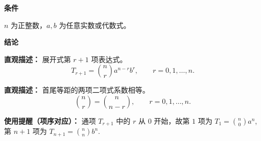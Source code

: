 \begin{statementbox}
	\textbf{\textcolor{CStatement}{条件}}
	\begin{description}[style=nextline, leftmargin=2.8em, labelsep=0.5em, itemsep=0.35em]
		\item[\textbf{\textcolor{CStatement}{条件 1（正整数与变量）：}}] $n$ 为正整数，$a, b$ 为任意实数或代数式。
	\end{description}

	\textbf{\textcolor{CStatement}{结论}}
	\begin{description}[style=nextline, leftmargin=2.8em, labelsep=0.5em, itemsep=0.45em]
		\item[\textbf{\textcolor{CStatement}{结论一（通项公式）：}}]
			\textbf{\textcolor{CStatement}{直观描述：}}
			展开式第 $r+1$ 项表达式。
			\[
				T_{r+1} = \binom{n}{r} a^{n-r} b^{r},
				\qquad
				r = 0,1,\dots, n.
			\]

		\item[\textbf{\textcolor{CStatement}{推广结论（系数对称）：}}]
			\textbf{\textcolor{CStatement}{直观描述：}}
			首尾等距的两项二项式系数相等。
			\[
				\binom{n}{r} = \binom{n}{n-r},
				\qquad
				r = 0,1,\dots,n.
			\]
	\end{description}

	\medskip
	\textbf{\textcolor{CStatement}{使用提醒（项序对应）：}}
	通项 $T_{r+1}$ 中的 $r$ 从 $0$ 开始，故第 $1$ 项为 $T_1 = \binom{n}{0} a^n$, 第 $n+1$ 项为 $T_{n+1} = \binom{n}{n} b^n$.
\end{statementbox}
